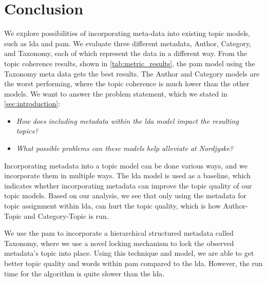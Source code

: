 \section{Conclusion}\label{sec:conclusion}
We explore possibilities of incorporating meta-data into existing topic models, such as \gls{lda} and \gls{pam}.
We evaluate three different metadata, Author, Category, and Taxonomy, each of which represent the data in a different way.
From the topic coherence results, shown in \autoref{tab:metric_results}, the \gls{pam} model using the Taxonomy meta data gets the best results.
The Author and Category models are the worst performing, where the topic coherence is much lower than the other models.
We want to answer the problem statement, which we stated in \autoref{sec:introduction}:

\begin{itemize}
	\item \textit{How does including metadata within the \gls{lda} model impact the resulting topics?}
	\item \textit{What possible problems can these models help alleviate at Nordjyske?}
\end{itemize}

Incorporating metadata into a topic model can be done various ways, and we incorporate them in multiple ways.
The \gls{lda} model is used as a baseline, which indicates whether incorporating metadata can improve the topic quality of our topic models.
Based on our analysis, we see that only using the metadata for topic assignment within \gls{lda}, can hurt the topic quality, which is how Author-Topic and Category-Topic is run.

We use the \gls{pam} to incorporate a hierarchical structured metadata called Taxonomy, where we use a novel locking mechanism to lock the observed metadata's topic into place.
Using this technique and model, we are able to get better topic quality and words within \gls{pam} compared to the \gls{lda}.
However, the run time for the algorithm is quite slower than the \gls{lda}.




